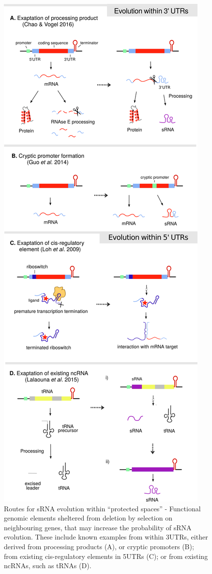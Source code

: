 \begin{figure}[H]
  \includegraphics[scale=1]{lit_review/pathways_to_sRNA_evo_final_2.png}
  \caption{Routes for sRNA evolution within “protected spaces” - Functional genomic elements sheltered from deletion by selection on neighbouring genes, that may increase the probability of sRNA evolution. These include known examples from within 3\textprime UTRs, either derived from processing products (A), or cryptic promoters (B); from existing cis-regulatory elements in 5\textprime UTRs (C); or from existing ncRNAs, such as tRNAs (D).}
  \label{fig:pathways_to_sRNA_evo}
\end{figure}


